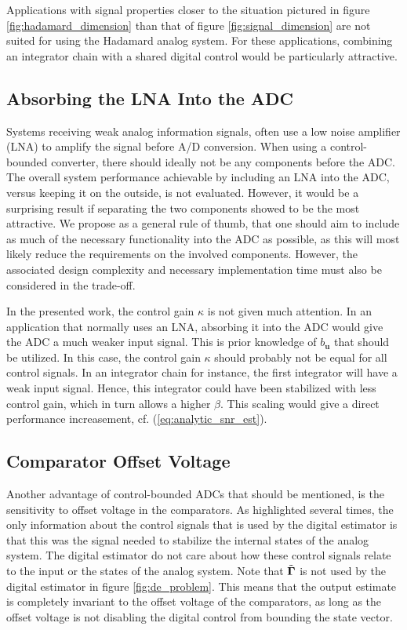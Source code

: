 Applications with signal properties closer to the situation pictured in figure \ref{fig:hadamard_dimension} than that of figure \ref{fig:signal_dimension} are not suited for using the Hadamard analog system. For these applications, combining an integrator chain with a shared digital control would be particularly attractive.






\subsection{Absorbing the LNA Into the ADC}
Systems receiving weak analog information signals, often use a low noise amplifier (LNA) to amplify the signal before A/D conversion. When using a control-bounded converter, there should ideally not be any components before the ADC. The overall system performance achievable by including an LNA into the ADC, versus keeping it on the outside, is not evaluated. However, it would be a surprising result if separating the two components showed to be the most attractive. We propose as a general rule of thumb, that one should aim to include as much of the necessary functionality into the ADC as possible, as this will most likely reduce the requirements on the involved components. However, the associated design complexity and necessary implementation time must also be considered in the trade-off.

In the presented work, the control gain $\kappa$ is not given much attention. In an application that normally uses an LNA, absorbing it into the ADC would give the ADC a much weaker input signal. This is prior knowledge of $b_{\bm{u}}$ that should be utilized. In this case, the control gain $\kappa$ should probably not be equal for all control signals. In an integrator chain for instance, the first integrator will have a weak input signal. Hence, this integrator could have been stabilized with less control gain, which in turn allows a higher $\beta$. This scaling would give a direct performance increasement, cf. (\ref{eq:analytic_snr_est}).





\subsection{Comparator Offset Voltage}
Another advantage of control-bounded ADCs that should be mentioned, is the sensitivity to offset voltage in the comparators. As highlighted several times, the only information about the control signals that is used by the digital estimator is that this was the signal needed to stabilize the internal states of the analog system. The digital estimator do not care about how these control signals relate to the input or the states of the analog system. Note that $\tilde{\bm{\Gamma}}$ is not used by the digital estimator in figure \ref{fig:de_problem}. This means that the output estimate is completely invariant to the offset voltage of the comparators, as long as the offset voltage is not disabling the digital control from bounding the state vector.

